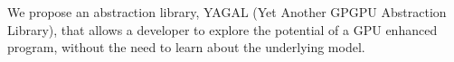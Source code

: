 We propose an abstraction library, YAGAL (Yet Another GPGPU Abstraction Library), that allows a developer to explore the potential of a GPU enhanced program, without the need to learn about the underlying model.